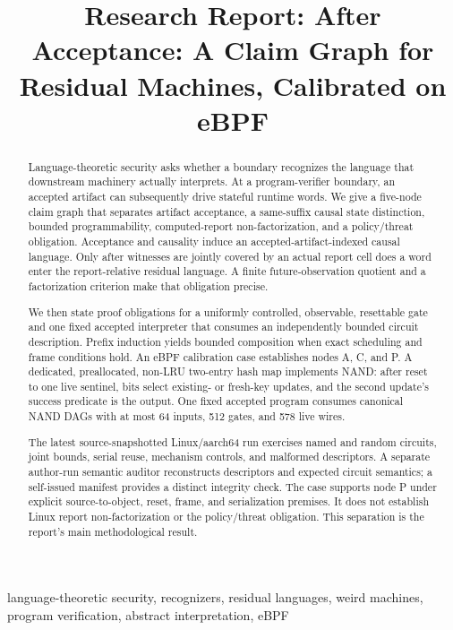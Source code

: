 \documentclass[conference]{IEEEtran}
\title{Research Report: After Acceptance: A Claim Graph for Residual Machines, Calibrated on eBPF}
\author{\IEEEauthorblockN{Author Name(s)}
\IEEEauthorblockA{Affiliation(s)\\Email address(es)}}
\begin{document}
\maketitle

\begin{abstract}
Language-theoretic security asks whether a boundary recognizes the language that downstream machinery actually interprets. At a program-verifier boundary, an accepted artifact can subsequently drive stateful runtime words. We give a five-node claim graph that separates artifact acceptance, a same-suffix causal state distinction, bounded programmability, computed-report non-factorization, and a policy/threat obligation. Acceptance and causality induce an accepted-artifact-indexed causal language. Only after witnesses are jointly covered by an actual report cell does a word enter the report-relative residual language. A finite future-observation quotient and a factorization criterion make that obligation precise.

We then state proof obligations for a uniformly controlled, observable, resettable gate and one fixed accepted interpreter that consumes an independently bounded circuit description. Prefix induction yields bounded composition when exact scheduling and frame conditions hold. An eBPF calibration case establishes nodes A, C, and P. A dedicated, preallocated, non-LRU two-entry hash map implements NAND: after reset to one live sentinel, bits select existing- or fresh-key updates, and the second update's success predicate is the output. One fixed accepted program consumes canonical NAND DAGs with at most 64 inputs, 512 gates, and 578 live wires.

The latest source-snapshotted Linux/aarch64 run exercises named and random circuits, joint bounds, serial reuse, mechanism controls, and malformed descriptors. A separate author-run semantic auditor reconstructs descriptors and expected circuit semantics; a self-issued manifest provides a distinct integrity check. The case supports node P under explicit source-to-object, reset, frame, and serialization premises. It does not establish Linux report non-factorization or the policy/threat obligation. This separation is the report's main methodological result.
\end{abstract}

\begin{IEEEkeywords}
language-theoretic security, recognizers, residual languages, weird machines, program verification, abstract interpretation, eBPF
\end{IEEEkeywords}
\end{document}
